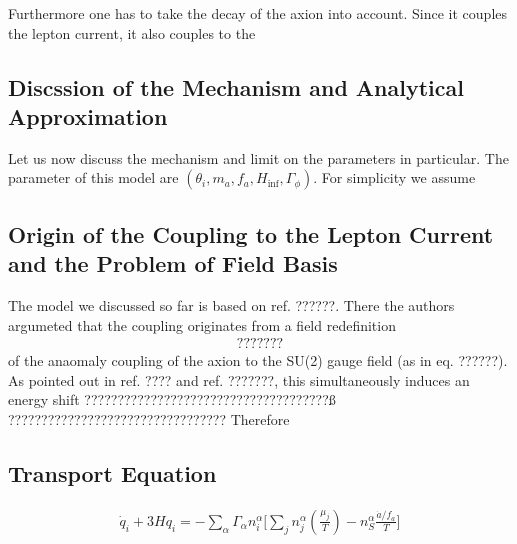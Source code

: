 \documentclass[13pt,a4paper,twoside,titlepage]{article}
\begin{document}
Furthermore one has to take the decay of the axion into account.
Since it couples the lepton current, it also couples to the

\subsection{Discssion of the Mechanism and Analytical Approximation}
Let us now discuss the mechanism and limit on the parameters in particular.
The parameter of this model are $(\theta_i, m_a, f_a, H_\mathrm{inf}, \Gamma_\phi)$.
For simplicity we assume

\subsection{Origin of the Coupling to the Lepton Current and the Problem of Field Basis}
The model we discussed so far is based on ref. ??????.
There the authors argumeted that the coupling originates from a field redefinition
\begin{align}
    ???????
\end{align}
of the anaomaly coupling of the axion to the SU(2) gauge field (as in eq. ??????).
As pointed out in ref. ???? and ref. ???????, this simultaneously induces an energy shift
?????????????????????????????????????ß
?????????????????????????????????
Therefore


\subsection{Transport Equation}

\begin{align}
    \dot{q}_i + 3 H q_i = - \sum_\alpha \Gamma_\alpha n^\alpha_i \Big[
    \sum_j n^\alpha_j \left( \frac{\mu_j}{T} \right) - n_S^\alpha \frac{\dot{a} / f_a}{T} \Big]
\end{align}
\end{document}
